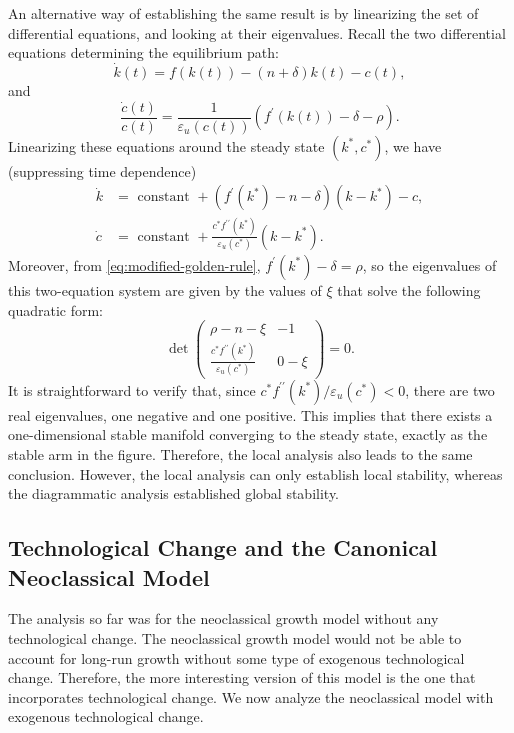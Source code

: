 \documentclass[\topdir/lecture\_notes.tex]{subfiles}
\begin{document}
An alternative way of establishing the same result is by linearizing the set of differential equations, and looking at their eigenvalues. Recall the two differential equations determining the equilibrium path:
\[
  \dot{k}(t)=f(k(t))-(n+\delta) k(t)-c(t),
\]
and
\[
  \frac{\dot{c}(t)}{c(t)}=\frac{1}{\varepsilon_{u}(c(t))}\left(f^{\prime}(k(t))-\delta-\rho\right).
\]
Linearizing these equations around the steady state \(\left(k^{*}, c^{*}\right)\), we have (suppressing time dependence)
\[
  \begin{aligned}
    \dot{k} & =\text { constant }+\left(f^{\prime}\left(k^{*}\right)-n-\delta\right)\left(k-k^{*}\right)-c,                                \\
    \dot{c} & =\text { constant }+\frac{c^{*} f^{\prime \prime}\left(k^{*}\right)}{\varepsilon_{u}\left(c^{*}\right)}\left(k-k^{*}\right).
  \end{aligned}
\]
Moreover, from \eqref{eq:modified-golden-rule}, \(f^{\prime}\left(k^{*}\right)-\delta=\rho\), so the eigenvalues of this two-equation system are given by the values of \(\xi\) that solve the following quadratic form:
\[
  \operatorname{\det}\left(\begin{array}{cc}
      \rho-n-\xi                                                                          & -1    \\
      \frac{c^{*} f^{\prime \prime}\left(k^{*}\right)}{\varepsilon_{u}\left(c^{*}\right)} & 0-\xi
    \end{array}\right)=0.
\]
It is straightforward to verify that, since \(c^{*} f^{\prime \prime}\left(k^{*}\right) / \varepsilon_{u}\left(c^{*}\right)<0\), there are two real eigenvalues, one negative and one positive. This implies that there exists a one-dimensional stable manifold converging to the steady state, exactly as the stable arm in the figure. Therefore, the local analysis also leads to the same conclusion. However, the local analysis can only establish local stability, whereas the diagrammatic analysis established global stability.

\subsection{Technological Change and the Canonical Neoclassical Model}
The analysis so far was for the neoclassical growth model without any technological change.
The neoclassical growth model would not be able to account for long-run growth without some type of exogenous technological change.
Therefore, the more interesting version of this model is the one that incorporates technological change.
We now analyze the neoclassical model with exogenous technological change.
\end{document}
